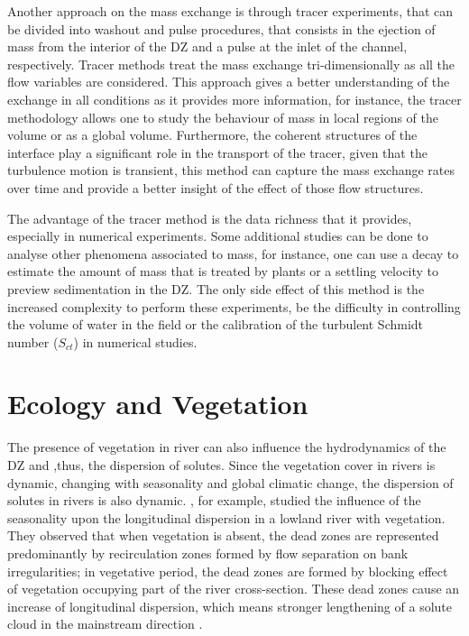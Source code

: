 Another approach on the mass exchange is through tracer experiments, that can be divided into washout and pulse procedures, that consists in the ejection of mass from the interior of the DZ and a pulse at the inlet of the channel, respectively.  Tracer methods treat the mass exchange tri-dimensionally as all the flow variables are considered. This approach gives a better understanding of the exchange in all conditions as it provides more information, for instance, the tracer methodology allows one to study the behaviour of mass in local regions of the volume or as a global volume. Furthermore, the coherent structures of the interface play a significant role in the transport of the tracer, given that the turbulence motion is transient, this method can capture the mass exchange rates over time and provide a better insight of the effect of those flow structures.

The advantage of the tracer method is the data richness that it provides, especially in numerical experiments. Some additional studies can be done to analyse other phenomena associated to mass, for instance, one can use a decay to estimate the amount of mass that is treated by plants or a settling velocity to preview sedimentation in the DZ. The only side effect of this method is the increased complexity to perform these experiments, be the difficulty in controlling the volume of water in the field or the calibration of the turbulent Schmidt number ($S_{ct}$) in numerical studies. 
\section{Ecology and Vegetation}
The presence of vegetation in river can also influence the hydrodynamics of the DZ and ,thus, the dispersion of solutes. Since the vegetation cover in rivers is dynamic, changing with seasonality and global climatic change, the dispersion of solutes in rivers is also dynamic. \cite{sukhodolova2006}, for example, studied the influence of the seasonality upon the longitudinal dispersion in a lowland river with vegetation. They observed that when vegetation is absent, the dead zones are represented predominantly by recirculation zones formed by flow separation on bank irregularities; in vegetative period, the dead zones are formed by blocking effect of vegetation occupying part of the river cross-section. These dead zones cause an increase of longitudinal dispersion, which means stronger lengthening of a solute cloud in the mainstream direction \cite{weitbrecht2004}.

